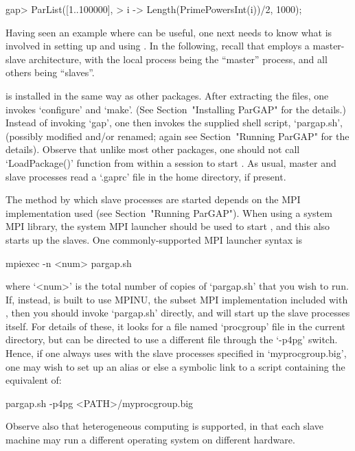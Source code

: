 \beginexample
gap> ParList([1..100000],
>            i -> Length(PrimePowersInt(i))/2, 1000);
\endexample


Having seen an example where {\ParGAP} can be useful, one next  needs  to
know what is involved in setting up and using {\ParGAP}. In the following,
recall that {\ParGAP} employs  a  master-slave  architecture, with the local
process being the ``master'' process, and all others being ``slaves''.

{\ParGAP} is installed in the same way as other  {\GAP}  packages.  After
extracting the {\ParGAP} files, one invokes `configure' and `make'.  (See
Section~"Installing ParGAP" for the details.) Instead of invoking `gap', 
one  then  invokes  the  supplied  shell
script,  `pargap.sh',  (possibly  modified  and/or  renamed;  again   see
Section~"Running ParGAP" for the details). Observe that unlike most other
{\GAP} packages, one should not  call  `LoadPackage()'  function  from
within a {\GAP} session to start {\ParGAP}. As usual,  master  and  slave
processes read a  `.gaprc'  file  in  the  home  directory,  if  present.

The method by which slave processes are started depends on the MPI 
implementation used (see Section~"Running ParGAP"). When using a system MPI
library, the system MPI launcher should be used to start {\ParGAP}, and 
this also starts up the slaves. One commonly-supported MPI launcher syntax is

 mpiexec -n <num> pargap.sh

where `<num>' is the total number of copies of `pargap.sh' that you wish to 
run. If, instead, {\ParGAP} is built to use MPINU, the subset MPI implementation
included with {\ParGAP}, then you should invoke `pargap.sh' directly,
and {\ParGAP} will start up the slave processes itself. For details of these, 
it looks  for  a  file  named  `procgroup'  file  in  the  current
directory, but can be directed  to  use  a  different  file  through  the
`-p4pg' switch. Hence, if one always uses {\ParGAP}
with the slave processes specified in `myprocgroup.big', one may wish  to
set up an alias or else a  symbolic  link  to  a  script  containing  the
equivalent of:

pargap.sh -p4pg <PATH>/myprocgroup.big

Observe also that heterogeneous computing  is  supported,  in  that  each
slave machine may run a different operating system on different hardware.

